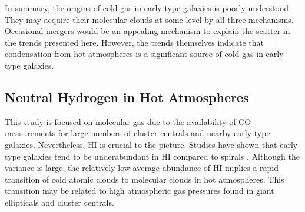 \documentclass[iop]{emulateapj}
\begin{document}

In summary, the origins of cold gas in early-type galaxies is poorly understood. They may acquire their molecular clouds at some level by all three mechanisms.  Occasional mergers would be an appealing mechanism to explain the scatter in the trends presented here.  However, the trends themselves indicate that condensation from hot atmospheres is a significant source of cold gas in early-type galaxies.

\subsection{Neutral Hydrogen in Hot Atmospheres}

This study is focused on molecular gas due to the availability of CO measurements for large numbers of cluster centrals and nearby early-type galaxies. Nevertheless, HI is crucial to the picture.   Studies have shown that early-type galaxies tend to be underabundant in HI compared to spirals  \citep{Young:89, Young:91, Sage:93, Obreschkow:08, Oosterloo:10}.  Although the variance is large, the relatively low average abundance of HI implies a rapid transition of cold atomic clouds to molecular clouds in hot atmospheres. This transition may be related to high atmospheric gas pressures found in giant ellipticals and cluster centrals. 
\end{document}
